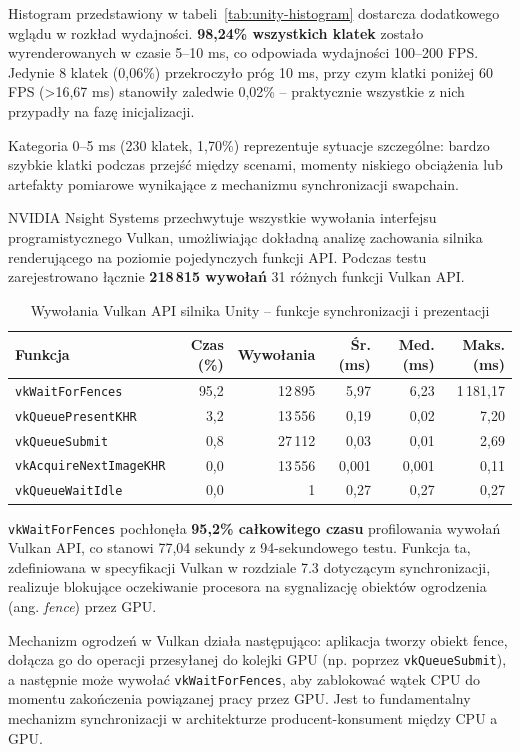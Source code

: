 Histogram przedstawiony w tabeli~\ref{tab:unity-histogram} dostarcza dodatkowego wglądu w rozkład 
wydajności. \textbf{98,24\% wszystkich klatek} 
zostało wyrenderowanych w czasie 5--10 ms, co odpowiada wydajności 100--200 FPS. Jedynie 8 klatek 
(0,06\%) przekroczyło próg 10 ms, przy czym klatki 
poniżej 60 FPS (>16,67 ms) stanowiły zaledwie 0,02\% -- praktycznie wszystkie z nich przypadły na fazę 
inicjalizacji.

Kategoria 0--5 ms (230 klatek, 1,70\%) reprezentuje sytuacje szczególne: bardzo szybkie klatki podczas 
przejść między scenami, momenty niskiego 
obciążenia lub artefakty pomiarowe wynikające z mechanizmu synchronizacji swapchain.


NVIDIA Nsight Systems przechwytuje wszystkie wywołania interfejsu programistycznego Vulkan, umożliwiając dokładną analizę zachowania silnika 
renderującego na poziomie pojedynczych funkcji API. Podczas testu zarejestrowano łącznie \textbf{218\,815 wywołań} 31 różnych funkcji Vulkan API.

\begin{table}[H]
\centering
\caption{Wywołania Vulkan API silnika Unity -- funkcje synchronizacji i prezentacji}
\label{tab:unity-vulkan-sync}
\small
\begin{tabular}{|l|r|r|r|r|r|}
\hline
\textbf{Funkcja} & \textbf{Czas (\%)} & \textbf{Wywołania} & \textbf{Śr. (ms)} & \textbf{Med. (ms)} & \textbf{Maks. (ms)} \\
\hline
\texttt{vkWaitForFences} & 95,2 & 12\,895 & 5,97 & 6,23 & 1\,181,17 \\
\texttt{vkQueuePresentKHR} & 3,2 & 13\,556 & 0,19 & 0,02 & 7,20 \\
\texttt{vkQueueSubmit} & 0,8 & 27\,112 & 0,03 & 0,01 & 2,69 \\
\texttt{vkAcquireNextImageKHR} & 0,0 & 13\,556 & 0,001 & 0,001 & 0,11 \\
\texttt{vkQueueWaitIdle} & 0,0 & 1 & 0,27 & 0,27 & 0,27 \\
\hline
\end{tabular}
\end{table}

\texttt{vkWaitForFences} pochłonęła \textbf{95,2\% całkowitego czasu}
profilowania wywołań Vulkan API, co stanowi 77,04 sekundy z 
94-sekundowego testu. Funkcja ta, zdefiniowana w specyfikacji Vulkan w rozdziale 7.3 dotyczącym 
synchronizacji, realizuje blokujące oczekiwanie 
procesora na sygnalizację obiektów ogrodzenia (ang. \textit{fence}) przez GPU.

Mechanizm ogrodzeń w Vulkan działa następująco: aplikacja tworzy obiekt fence, 
dołącza go do operacji przesyłanej do kolejki GPU
(np. poprzez \texttt{vkQueueSubmit}), a następnie może wywołać \texttt{vkWaitForFences}, 
aby zablokować wątek CPU do momentu zakończenia 
powiązanej pracy przez GPU. Jest to fundamentalny mechanizm synchronizacji w architekturze 
producent-konsument między CPU a GPU.

